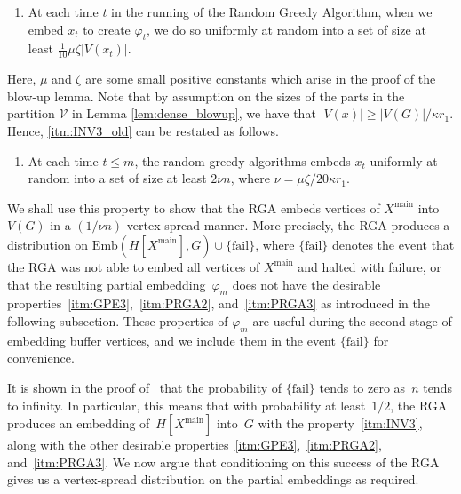\documentclass[final]{article}
\theoremstyle{definition}
\newcommand{\itmarab}[1]{\mbox{\rm 
({\it #1}\,\arabic{*}\hspace{0.05em})}}
\newcommand{\main}{\mathrm{main}}
\newcommand{\Emb}{\mathrm{Emb}}
\newcommand{\fail}{\mathrm{fail}}
\begin{document}
\begin{enumerate}[start = 3, label = \itmarab{INV}]
    \item \label{itm:INV3_old} At each time $t$ in the running of the Random Greedy Algorithm, when we embed $x_t$ to create $\varphi_t$, we do so uniformly at random into a set of size at least $\frac{1}{10}\mu \zeta |V(x_t)|$.
\end{enumerate}
Here, $\mu$ and $\zeta$ are some small positive constants which arise in the proof of the blow-up lemma. Note that by assumption on the sizes of the parts in the partition $\mathcal{V}$ in Lemma \ref{lem:dense_blowup}, we have that $|V(x)| \geq |V(G)|/\kappa r_1$. Hence, \ref{itm:INV3_old} can be restated as follows. 

\begin{enumerate}[start = 1, label = \itmarab{RGA}]
    \item \label{itm:INV3} At each time $t \leq m$, the random greedy algorithms embeds $x_t$ uniformly at random into a set of size at least $2\nu n $, where $\nu = \mu \zeta / 20 \kappa r_1$.
\end{enumerate}

We shall use this property to show that the RGA embeds vertices of $X^{\main}$ into $V(G)$ in a $(1/\nu n)$-vertex-spread manner. More precisely, the RGA produces a distribution on $\Emb(H[X^\main],G) \cup \{\fail\}$, where $\{\fail\}$ denotes the event that the RGA was not able to embed all vertices of $X^{\main}$ and halted with failure, or that the resulting partial embedding~$\varphi_m$ does not have the desirable properties~\ref{itm:GPE3},~\ref{itm:PRGA2}, and~\ref{itm:PRGA3} as introduced in the following subsection. These properties of $\varphi_m$ are useful during the second stage of embedding buffer vertices, and we include them in the event $\{\fail\}$ for convenience. 

It is shown in the proof of~\cite[Lemma~4.1]{sparse_blowup} that the probability of $\{\fail\}$ tends to zero as~$n$ tends to infinity. In particular, this means that with probability at least~$1/2$, the RGA produces an embedding of~$H[X^{\main}]$ into~$G$ with the property~\ref{itm:INV3}, along with the other desirable properties~\ref{itm:GPE3},~\ref{itm:PRGA2}, and~\ref{itm:PRGA3}. We now argue that conditioning on this success of the RGA gives us a vertex-spread distribution on the partial embeddings as required. 
\end{document}
